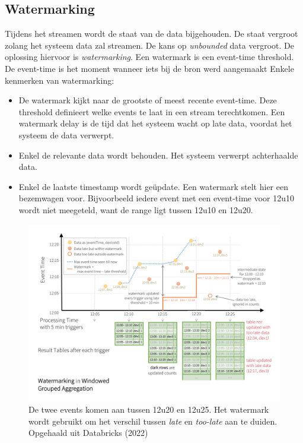 \documentclass[a4paper,10pt,twoside]{report}
\begin{document}
\newpage

\subsection{Watermarking}

Tijdens het streamen wordt de staat van de data bijgehouden. De staat vergroot zolang het systeem data zal streamen. De kans op \textit{unbounded} data vergroot. De oplossing hiervoor is \textit{watermarking}. Een watermark is een event-time threshold. De event-time is het moment wanneer iets bij de bron werd aangemaakt Enkele kenmerken van watermarking:
\begin{itemize}
	\item De watermark kijkt naar de grootste of meest recente event-time. Deze threshold definieert welke events te laat in een stream terechtkomen. Een watermark delay is de tijd dat het systeem wacht op late data, voordat het systeem de data verwerpt.
	\item Enkel de relevante data wordt behouden. Het systeem verwerpt achterhaalde data.
	\item Enkel de laatste timestamp wordt geüpdate. Een watermark stelt hier een bezemwagen voor. Bijvoorbeeld iedere event met een event-time voor 12u10 wordt niet meegeteld, want de range ligt tussen 12u10 en 12u20.
\end{itemize}

\begin{figure}
	\includegraphics[width=\linewidth]{images/watermarking-in-windowed-grouped-aggregation.png}
	\caption{De twee events komen aan tussen 12u20 en 12u25. Het watermark wordt gebruikt om het verschil tussen \textit{late} en \textit{too-late} aan te duiden. Opgehaald uit Databricks (2022)}
\end{figure}
\end{document}
